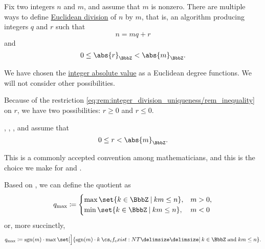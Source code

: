\begin{remark}\label{rem:integer_division_uniqueness}
  Fix two integers \( n \) and \( m \), and assume that \( m \) is nonzero. There are multiple ways to define \hyperref[def:euclidean_domain]{Euclidean division} of \( n \) by \( m \), that is, an algorithm producing integers \( q \) and \( r \) such that
  \begin{equation*}
    n = mq + r
  \end{equation*}
  and
  \begin{equation}\label{eq:rem:integer_division_uniqueness/rem_inequality}
    0 \leq \abs{r}_\BbbZ < \abs{m}_\BbbZ.
  \end{equation}

  We have chosen the \hyperref[def:integer_absolute_value]{integer absolute value} as a Euclidean degree functions. We will not consider other possibilities.

  Because of the restriction \eqref{eq:rem:integer_division_uniqueness/rem_inequality} on \( r \), we have two possibilities: \( r \geq 0 \) and \( r \leq 0 \).

  \begin{thmenum}
     , , ,  and  assume that
    \begin{equation*}
      0 \leq r < \abs{m}_\BbbZ.
    \end{equation*}

    This is a commonly accepted convention among mathematicians, and this is the choice we make for  and \cite{notebook:code}.

    Based on \cite[prop. 1.1]{Knapp2016BasicAlgebra}, we can define the quotient as
    \begin{equation}\label{eq:rem:integer_division_uniqueness/max/q_cases}
      q_{\max} \coloneqq \begin{cases}
        \max\set{ k \in \BbbZ \given km \leq n }, &m > 0, \\
        \min\set{ k \in \BbbZ \given km \leq n }, &m < 0
      \end{cases}
    \end{equation}
    or, more succinctly,
    \begin{equation}\label{eq:rem:integer_division_uniqueness/max/q}
      q_{\max} \coloneqq \sgn(m) \cdot \max\set[\Big]{ \sgn(m) \cdot k \given* k \in \BbbZ \T{and} km \leq n }.
    \end{equation}


\end{thmenum}
\end{remark}
